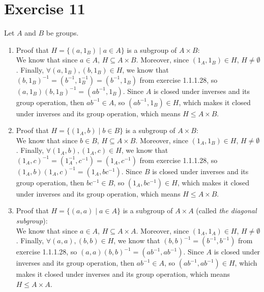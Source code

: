\documentclass[12pt]{article}
\begin{document}
    \section*{Exercise 11}
    Let $A$ and $B$ be groups. \\
    \begin{enumerate}[label=\textbf{\alph*.}]
        \item 
            Proof that $H = \{(a, 1_B) \mid a \in A\}$
            is a subgroup of $A \times B$: \\
            We know that since $a \in A$, $H \subseteq A \times B$.
            Moreover, since $(1_A, 1_B) \in H$, $H \neq \emptyset$.
            Finally, $\forall (a, 1_B), (b, 1_B) \in H$,
            we know that $(b, 1_B)^{-1} = (b^{-1}, 1_B^{-1})
            = (b^{-1}, 1_B)$ from exercise 1.1.1.28,
            so $(a, 1_B)(b, 1_B)^{-1} = (ab^{-1}, 1_B)$.
            Since $A$ is closed under inverses and its group operation,
            then $ab^{-1} \in A$,
            so $(ab^{-1}, 1_B) \in H$,
            which makes it closed under inverses and its group operation,
            which means $H \leqslant A \times B$.
        \item
            Proof that $H = \{(1_A, b) \mid b \in B\}$
            is a subgroup of $A \times B$: \\
            We know that since $b \in B$, $H \subseteq A \times B$.
            Moreover, since $(1_A, 1_B) \in H$, $H \neq \emptyset$.
            Finally, $\forall (1_A, b), (1_A, c) \in H$,
            we know that $(1_A, c)^{-1} = (1_A^{-1}, c^{-1})
            = (1_A, c^{-1})$ from exercise 1.1.1.28,
            so $ (1_A, b)(1_A, c)^{-1} = (1_A, bc^{-1})$.
            Since $B$ is closed under inverses and its group operation,
            then $bc^{-1} \in B$,
            so $(1_A, bc^{-1}) \in H$,
            which makes it closed under inverses and its group operation,
            which means $H \leqslant A \times B$.
        \item
            Proof that $H = \{(a, a) \mid a \in A\}$
            is a subgroup of $A \times A$
            (called \textit{the diagonal subgroup}): \\
            We know that since $a \in A$, $H \subseteq A \times A$.
            Moreover, since $(1_A, 1_A) \in H$, $H \neq \emptyset$.
            Finally, $\forall (a, a), (b, b) \in H$,
            we know that $(b, b)^{-1} = (b^{-1}, b^{-1})$
            from exercise 1.1.1.28,
            so $(a, a)(b, b)^{-1} = (ab^{-1}, ab^{-1})$.
            Since $A$ is closed under inverses and its group operation,
            then $ab^{-1} \in A$,
            so $(ab^{-1}, ab^{-1}) \in H$,
            which makes it closed under inverses and its group operation,
            which means $H \leqslant A \times A$.
    \end{enumerate}
\end{document}
